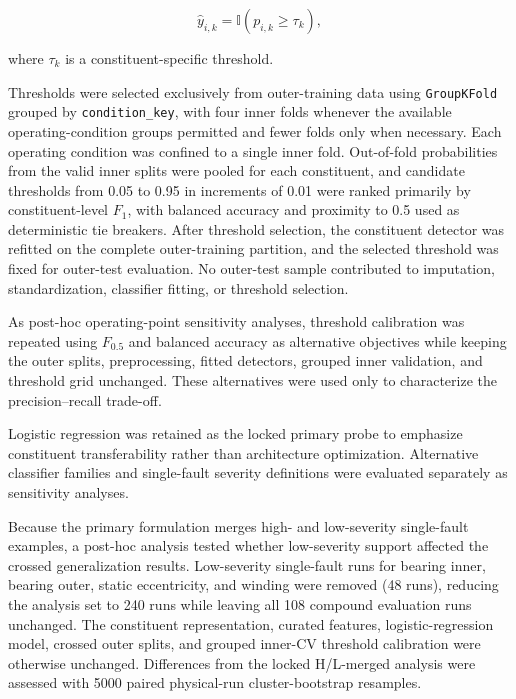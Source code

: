 \documentclass{ieeeaccess}
\begin{document}
\begin{equation}
\hat{y}_{i,k}
=
\mathbb{I}\left(p_{i,k}\geq\tau_k\right),
\label{eq:binary_decision}
\end{equation}

where $\tau_k$ is a constituent-specific threshold.

Thresholds were selected exclusively from outer-training data using
\texttt{GroupKFold} grouped by \texttt{condition\_key}, with four inner folds
whenever the available operating-condition groups permitted and fewer folds
only when necessary. Each operating condition was confined to a single inner
fold. Out-of-fold probabilities from the valid inner splits were pooled for
each constituent, and candidate thresholds from 0.05 to 0.95 in increments of
0.01 were ranked primarily by constituent-level $F_1$, with balanced accuracy
and proximity to 0.5 used as deterministic tie breakers. After threshold
selection, the constituent detector was refitted on the complete outer-training
partition, and the selected threshold was fixed for outer-test evaluation.
No outer-test sample contributed to imputation, standardization, classifier
fitting, or threshold selection.

As post-hoc operating-point sensitivity analyses, threshold calibration was
repeated using $F_{0.5}$ and balanced accuracy as alternative objectives while
keeping the outer splits, preprocessing, fitted detectors, grouped inner
validation, and threshold grid unchanged. These alternatives were used only
to characterize the precision--recall trade-off.

Logistic regression was retained as the locked primary probe to emphasize
constituent transferability rather than architecture optimization. Alternative
classifier families and single-fault severity definitions were evaluated
separately as sensitivity analyses.

Because the primary formulation merges high- and low-severity single-fault
examples, a post-hoc analysis tested whether low-severity support affected the
crossed generalization results. Low-severity single-fault runs for bearing
inner, bearing outer, static eccentricity, and winding were removed (48 runs),
reducing the analysis set to 240 runs while leaving all 108 compound
evaluation runs unchanged. The constituent representation, curated features,
logistic-regression model, crossed outer splits, and grouped inner-CV
threshold calibration were otherwise unchanged. Differences from the locked
H/L-merged analysis were assessed with 5000 paired physical-run
cluster-bootstrap resamples.
\end{document}
